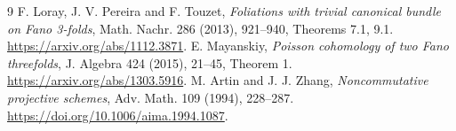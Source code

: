 \documentclass[a4paper,11pt]{ltjsarticle}
\theoremstyle{remark}
\begin{document}
\begin{thebibliography}{9}
 F. Loray, J. V. Pereira and F. Touzet,
\emph{Foliations with trivial canonical bundle on Fano 3-folds},
Math. Nachr. 286 (2013), 921--940, Theorems 7.1, 9.1.
\url{https://arxiv.org/abs/1112.3871}.
 E. Mayanskiy, \emph{Poisson cohomology of two Fano threefolds},
J. Algebra 424 (2015), 21--45, Theorem 1.
\url{https://arxiv.org/abs/1303.5916}.
 M. Artin and J. J. Zhang, \emph{Noncommutative projective schemes},
Adv. Math. 109 (1994), 228--287.
\url{https://doi.org/10.1006/aima.1994.1087}.
\end{thebibliography}
\end{document}
